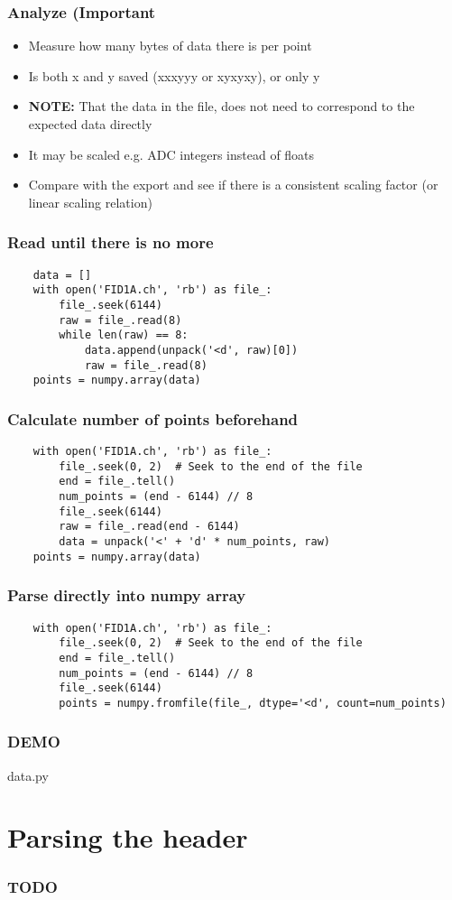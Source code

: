 \documentclass{beamer}
\begin{document}
\begin{frame}
  \frametitle{Analyze (Important}
  \begin{itemize}
  \item Measure how many bytes of data there is per point
  \item Is both x and y saved (xxxyyy or xyxyxy), or only y
  \item \textbf{NOTE:} That the data in the file, does not need to
    correspond to the expected data directly
  \item It may be scaled e.g. ADC integers instead of floats
  \item Compare with the export and see if there is a consistent
    scaling factor (or linear scaling relation)
  \end{itemize}
\end{frame}

\begin{frame}[fragile]
  \frametitle{Read until there is no more}
  \begin{verbatim}
    data = []
    with open('FID1A.ch', 'rb') as file_:
        file_.seek(6144)
        raw = file_.read(8)
        while len(raw) == 8:
            data.append(unpack('<d', raw)[0])
            raw = file_.read(8)
    points = numpy.array(data)    
  \end{verbatim}
\end{frame}

\begin{frame}[fragile]
  \frametitle{Calculate number of points beforehand}
  \begin{verbatim}
    with open('FID1A.ch', 'rb') as file_:
        file_.seek(0, 2)  # Seek to the end of the file
        end = file_.tell()
        num_points = (end - 6144) // 8
        file_.seek(6144)
        raw = file_.read(end - 6144)
        data = unpack('<' + 'd' * num_points, raw)
    points = numpy.array(data)
  \end{verbatim}
\end{frame}

\begin{frame}[fragile]
  \frametitle{Parse directly into numpy array}
  \begin{verbatim}
    with open('FID1A.ch', 'rb') as file_:
        file_.seek(0, 2)  # Seek to the end of the file
        end = file_.tell()
        num_points = (end - 6144) // 8
        file_.seek(6144)
        points = numpy.fromfile(file_, dtype='<d', count=num_points)
  \end{verbatim}
\end{frame}

\begin{frame}
  \frametitle{DEMO}
  \huge
  data.py
\end{frame}

\section{Parsing the header}
\begin{frame}
  \frametitle{TODO}
\end{frame}
\end{document}
